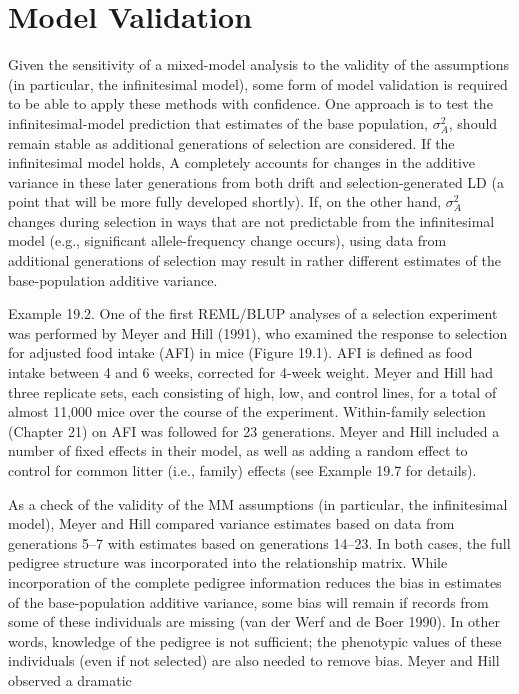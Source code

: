 \documentclass{article}
\begin{document}
\section{Model Validation}
Given the sensitivity of a mixed-model analysis to the validity of the assumptions (in particular, the infinitesimal model), some form of model validation is required to be able to apply these methods with confidence. One approach is to test the infinitesimal-model prediction that estimates of the base population,  $ \sigma_{A}^{2} $, should remain stable as additional generations of selection are considered. If the infinitesimal model holds, A completely accounts for changes in the additive variance in these later generations from both drift and selection-generated LD (a point that will be more fully developed shortly). If, on the other hand,  $ \sigma_{A}^{2} $ changes during selection in ways that are not predictable from the infinitesimal model (e.g., significant allele-frequency change occurs), using data from additional generations of selection may result in rather different estimates of the base-population additive variance.

Example 19.2. One of the first REML/BLUP analyses of a selection experiment was performed by Meyer and Hill (1991), who examined the response to selection for adjusted food intake (AFI) in mice (Figure 19.1). AFI is defined as food intake between 4 and 6 weeks, corrected for 4-week weight. Meyer and Hill had three replicate sets, each consisting of high, low, and control lines, for a total of almost 11,000 mice over the course of the experiment. Within-family selection (Chapter 21) on AFI was followed for 23 generations. Meyer and Hill included a number of fixed effects in their model, as well as adding a random effect to control for common litter (i.e., family) effects (see Example 19.7 for details).

As a check of the validity of the MM assumptions (in particular, the infinitesimal model), Meyer and Hill compared variance estimates based on data from generations 5–7 with estimates based on generations 14–23. In both cases, the full pedigree structure was incorporated into the relationship matrix. While incorporation of the complete pedigree information reduces the bias in estimates of the base-population additive variance, some bias will remain if records from some of these individuals are missing (van der Werf and de Boer 1990). In other words, knowledge of the pedigree is not sufficient; the phenotypic values of these individuals (even if not selected) are also needed to remove bias. Meyer and Hill observed a dramatic
\end{document}

